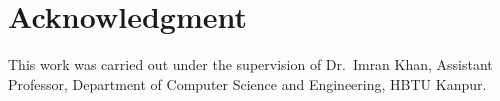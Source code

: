 \documentclass[conference]{IEEEtran}
\begin{document}
\section*{Acknowledgment}
This work was carried out under the supervision of Dr.\ Imran Khan, Assistant Professor, Department of Computer Science and Engineering, HBTU Kanpur.



\end{document}
